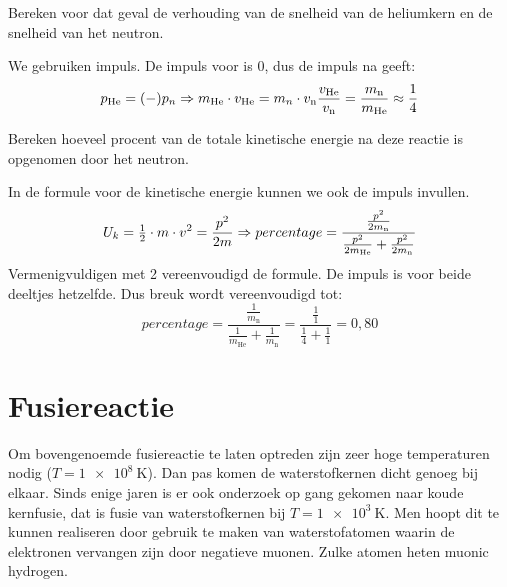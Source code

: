\begin{questions}
\question
Bereken voor dat geval de verhouding van de snelheid van de heliumkern en 
de snelheid van het neutron.
\begin{solution} 
 We gebruiken impuls. De impuls voor is 0, dus de impuls na geeft:
 \begin{equation}
 p_{\mathrm{He}} = (-) p_n \Rightarrow m_{\mathrm{He}} \cdot v_{\mathrm{He}} = m_n \cdot v_\mathrm{n} \\
 \frac{v_{\mathrm{He}}}{v_\mathrm{n}} = \frac{m_\mathrm{n}}{m_{\mathrm{He}}} \approx \frac{1}{4} 
\end{equation}
\end{solution} 

\question
Bereken hoeveel procent van de totale kinetische energie na deze reactie is opgenomen door het neutron.
\begin{solution} 
In de formule voor de kinetische energie kunnen we ook de impuls invullen.
\begin{equation}
U_k = \tfrac{1}{2} \cdot m \cdot v^2 = \frac{p^2}{2m} \\ \Rightarrow 
percentage = \frac{\frac{p^2}{2m_\mathrm{n}}}
                  {\frac{p^2}{2m_\mathrm{He}} + \frac{p^2}{2m_\mathrm{n}}}\\
\end{equation}
Vermenigvuldigen met 2 vereenvoudigd de formule. De impuls is voor beide deeltjes
hetzelfde. Dus breuk wordt vereenvoudigd tot:
\begin{equation}
percentage = \frac{\frac{1}{m_\mathrm{n}}}{\frac{1}{m_\mathrm{He}}+\frac{1}{m_\mathrm{n}}} 
    = \frac{\tfrac{1}{1}}{\tfrac{1}{4} + \tfrac{1}{1}} = 0,80 
\end{equation}
\end{solution}

\section{Fusiereactie}

Om bovengenoemde fusiereactie te laten optreden zijn zeer hoge 
temperaturen nodig ($T = \SI{1e8}{\kelvin}$). Dan pas komen de waterstofkernen dicht 
genoeg bij elkaar.
Sinds enige jaren is er ook onderzoek op gang gekomen naar koude kernfusie, 
dat is fusie van waterstofkernen bij $T = \SI{1e3}{\kelvin}$. Men hoopt dit te kunnen 
realiseren door gebruik te maken van waterstofatomen waarin de elektronen 
vervangen zijn door negatieve muonen. Zulke atomen heten muonic hydrogen.


\end{questions}
